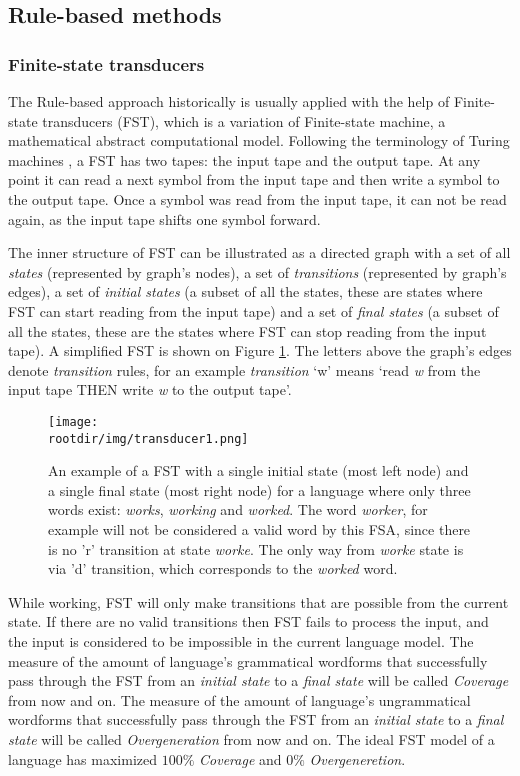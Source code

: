 \subsection{Rule-based methods}
\subsubsection{Finite-state transducers}
The Rule-based approach historically is usually applied with the help of Finite-state transducers (FST), which is a variation of Finite-state machine, a mathematical abstract computational model. Following the terminology of Turing machines \parencite{Turing_1937}, a FST has two tapes: the input tape and the output tape. At any point it can read a next symbol from the input tape and then write a symbol to the output tape. Once a symbol was read from the input tape, it can not be read again, as the input tape shifts one symbol forward.

The inner structure of FST can be illustrated as a directed graph with a set of all \textit{states} (represented by graph's nodes), a set of \textit{transitions} (represented by graph's edges), a set of \textit{initial states} (a subset of all the states, these are states where FST can start reading from the input tape) and a set of \textit{final states} (a subset of all the states, these are the states where FST can stop reading from the input tape). A simplified FST is shown on Figure \ref{fig:fst1}. The letters above the graph's edges denote \textit{transition} rules, for an example \textit{transition} `w' means `read \textit{w} from the input tape THEN write \textit{w} to the output tape'.

\begin{figure}[!h]
    \centering
    \texttt{[image: \\rootdir/img/transducer1.png]}
    \caption{An example of a FST with a single initial state (most left node) and a single final state (most right node) for a language where only three words exist: \textit{works}, \textit{working} and \textit{worked}. The word \textit{worker}, for example will not be considered a valid word by this FSA, since there is no 'r' transition at state \textit{worke}. The only way from \textit{worke} state is via 'd' transition, which corresponds to the \textit{worked} word. \parencite{beesley_fst_2002}}
    \label{fig:fst1}
\end{figure}

While working, FST will only make transitions that are possible from the current state. If there are no valid transitions then FST fails to process the input, and the input is considered to be impossible in the current language model. The measure of the amount of language's grammatical wordforms that successfully pass through the FST from an \textit{initial state} to a \textit{final state} will be called \textit{Coverage} from now and on. The measure of the amount of language's ungrammatical wordforms that successfully pass through the FST from an \textit{initial state} to a \textit{final state} will be called \textit{Overgeneration} from now and on. The ideal FST model of a language has maximized $100\%$ \textit{Coverage} and $0\%$ \textit{Overgeneretion}.


